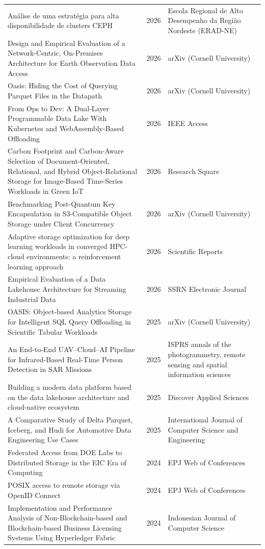 {\begin{longtable}{@{}p{8.2cm}cp{4.4cm}@{}}
Análise de uma estratégia para alta disponibilidade de clusters CEPH & 2026 & Escola Regional de Alto Desempenho da Região Nordeste (ERAD-NE) \\
Design and Empirical Evaluation of a Network-Centric, On-Premises Architecture for Earth Observation Data Access & 2026 & arXiv (Cornell University) \\
Oasis: Hiding the Cost of Querying Parquet Files in the Datapath & 2026 & arXiv (Cornell University) \\
From Ops to Dev: A Dual-Layer Programmable Data Lake With Kubernetes and WebAssembly-Based Offloading & 2026 & IEEE Access \\
Carbon Footprint and Carbon-Aware Selection of Document-Oriented, Relational, and Hybrid Object-Relational Storage for Image-Based Time-Series Workloads in Green IoT & 2026 & Research Square \\
Benchmarking Post-Quantum Key Encapsulation in S3-Compatible Object Storage under Client Concurrency & 2026 & arXiv (Cornell University) \\
Adaptive storage optimization for deep learning workloads in converged HPC-cloud environments: a reinforcement learning approach & 2026 & Scientific Reports \\
Empirical Evaluation of a Data Lakehouse Architecture for Streaming Industrial Data & 2026 & SSRN Electronic Journal \\
OASIS: Object-based Analytics Storage for Intelligent SQL Query Offloading in Scientific Tabular Workloads & 2025 & arXiv (Cornell University) \\
An End-to-End UAV–Cloud–AI Pipeline for Infrared-Based Real-Time Person Detection in SAR Missions & 2025 & ISPRS annals of the photogrammetry, remote sensing and spatial information sciences \\
Building a modern data platform based on the data lakehouse architecture and cloud-native ecosystem & 2025 & Discover Applied Sciences \\
A Comparative Study of Delta Parquet, Iceberg, and Hudi for Automotive Data Engineering Use Cases & 2025 & International Journal of Computer Science and Engineering \\
Federated Access from DOE Labs to Distributed Storage in the EIC Era of Computing & 2024 & EPJ Web of Conferences \\
POSIX access to remote storage via OpenID Connect & 2024 & EPJ Web of Conferences \\
Implementation and Performance Analysis of Non-Blockchain-based and Blockchain-based Business Licensing Systems Using Hyperledger Fabric & 2024 & Indonesian Journal of Computer Science \\

\end{longtable}}
